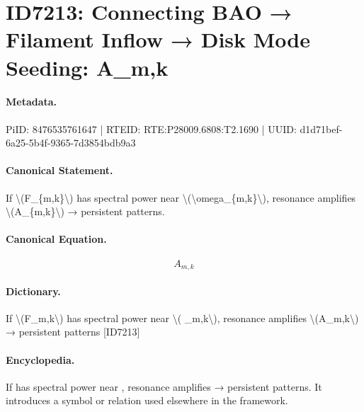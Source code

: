 \section*{ID7213: Connecting BAO → Filament Inflow → Disk Mode Seeding: A\_m,k}
\paragraph{Metadata.}
PiID: 8476535761647 | RTEID: RTE:P28009.6808:T2.1690 | UUID: d1d71bef-6a25-5b4f-9365-7d3854bdb9a3

\paragraph{Canonical Statement.}
If \textbackslash{}(F\_\{m,k\}\textbackslash{}) has spectral power near \textbackslash{}(\textbackslash{}omega\_\{m,k\}\textbackslash{}), resonance amplifies \textbackslash{}(A\_\{m,k\}\textbackslash{}) → persistent patterns.

\paragraph{Canonical Equation.}
\[
A_{m,k}
\]

\paragraph{Dictionary.}
If \textbackslash{}(F\_m,k\textbackslash{}) has spectral power near \textbackslash{}( \_m,k\textbackslash{}), resonance amplifies \textbackslash{}(A\_m,k\textbackslash{}) → persistent patterns [ID7213]

\paragraph{Encyclopedia.}
If has spectral power near , resonance amplifies → persistent patterns. It introduces a symbol or relation used elsewhere in the framework.
